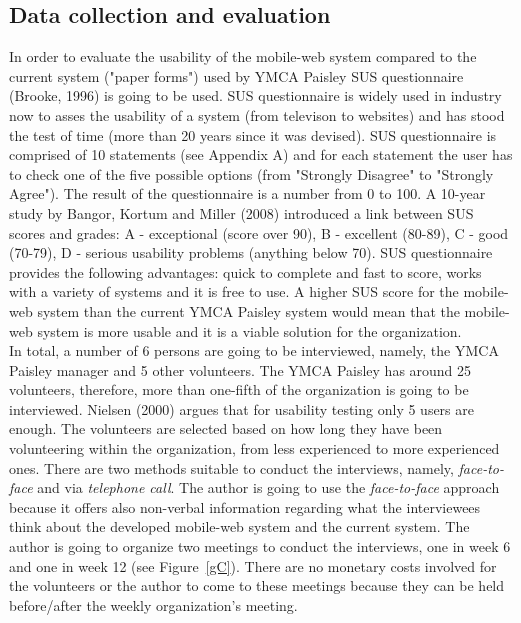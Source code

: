 \documentclass[version=last,fontsize=13pt]{scrartcl}
\begin{document}
\subsection{Data collection and evaluation}
	In order to evaluate the usability of the mobile-web system compared to the current system ("paper forms") used by YMCA Paisley SUS questionnaire (Brooke, 1996) is going to be used. SUS questionnaire is widely used in industry now to asses the usability of a system (from televison to websites) and has stood the test of time (more than 20 years since it was devised). SUS questionnaire is comprised of 10 statements (see Appendix A) and for each statement the user has to check one of the five possible options (from "Strongly Disagree" to "Strongly Agree"). The result of the questionnaire is a number from 0 to 100. A 10-year study by Bangor, Kortum and Miller (2008) introduced a link between SUS scores and grades: A - exceptional (score over 90), B - excellent (80-89), C - good (70-79), D - serious usability problems (anything below 70). SUS questionnaire provides the following advantages: quick to complete and fast to score, works with a variety of systems and it is free to use. A higher SUS score for the mobile-web system than the current YMCA Paisley system would mean that the mobile-web system is more usable and it is a viable solution for the organization.\\
	\indent
	In total, a number of 6 persons are going to be interviewed, namely, the YMCA Paisley manager and 5 other volunteers. The YMCA Paisley has around 25 volunteers, therefore, more than one-fifth of the organization is going to be interviewed. Nielsen (2000) argues that for usability testing  only 5 users are enough. The volunteers are selected based on how long they have been volunteering within the organization, from less experienced to more experienced ones. There are two methods suitable to conduct the interviews, namely, \textit{face-to-face} and via \textit{telephone call}. %
	The author is going to use the \textit{face-to-face} approach because it offers also non-verbal information regarding what the interviewees think about the developed mobile-web system and the current system.  The author is going to organize two meetings to conduct the interviews, one in week 6 and one in week 12 (see Figure~\ref{gC}). There are no monetary costs involved for the volunteers or the author to come to these meetings because they can be held before/after the weekly organization's meeting. %
\end{document}
